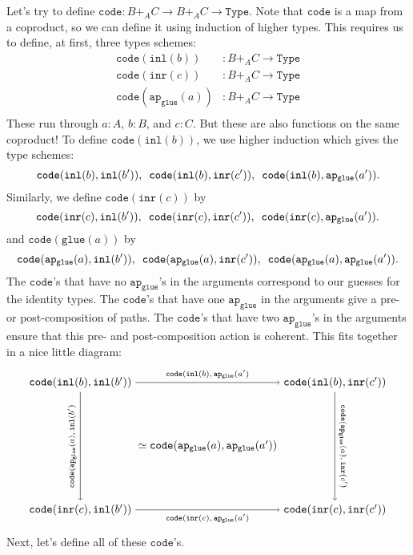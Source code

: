 \documentclass[11pt]{amsart}
\newcommand{\from}{\colon}
\newcommand{\tin}{\colon}
\newcommand{\type}[1]{\mathtt{#1}}
\begin{document}
Let's try to define 
$\type{code} \from B +_A C \to B +_A C \to \type{Type}$.  
Note that $\type{code}$ is a map from a coproduct, 
so we can define it using induction of higher types.
This requires us to define, at first, three types schemes:
\begin{align*}
	\type{code}(\type{inl}(b)) & \from B +_A C \to \type{Type} \\
	\type{code}(\type{inr}(c)) & \from B +_A C \to \type{Type} \\
	\type{code}(\type{ap_{glue}}(a)) & \from B +_A C \to \type{Type} \\
\end{align*}
These run through $a \tin A$, $b \tin B$, and $c \tin C$.  
But these are also functions on the same coproduct!
To define $\type{code}(\type{inl}(b))$, 
we use higher induction which gives the type schemes:
\[
	\type{code}(\type{inl}(b),\type{inl}(b')), \hspace{0.5em}
	\type{code}(\type{inl}(b),\type{inr}(c')), \hspace{0.5em}
	\type{code}(\type{inl}(b),\type{ap_{glue}}(a')).
\]
Similarly, we define $\type{code}(\type{inr}(c))$ by
\[
	\type{code}(\type{inr}(c),\type{inl}(b')), \hspace{0.5em}
	\type{code}(\type{inr}(c),\type{inr}(c')) , \hspace{0.5em}
	\type{code}(\type{inr}(c),\type{ap_{glue}}(a')).
\]
and $\type{code}(\type{glue}(a))$ by 
\[
	\type{code}(\type{ap_{glue}}(a),\type{inl}(b')), \hspace{0.5em}
	\type{code}(\type{ap_{glue}}(a),\type{inr}(c')) , \hspace{0.5em} 
	\type{code}(\type{ap_{glue}}(a),\type{ap_{glue}}(a')).
\]
The $\type{code}$'s that have 
no $\type{ap_{glue}}$'s in the arguments 
correspond to our guesses
for the identity types.
The $\type{code}$'s that have 
one $\type{ap_{glue}}$ in the arguments
give a pre- or post-composition
of paths.
The $\type{code}$'s that have 
two $\type{ap_{glue}}$'s in the arguments  
ensure that this pre- and post-composition
action is coherent.
This fits together in a nice little 
diagram:
\[
	\begin{tikzpicture}
		\node (AA) at (0,0) 
			{ $ \simeq \type{ code } ( \type{ ap_{glue} } ( a ) , \type{ ap_{glue} } ( a' )  )$ }; 
		\node (BB) at (-4,2) 
			{ $ \type{ code } ( \type{ inl } ( b ) , \type{ inl } ( b' )  )$ }; 
		\node (BC) at (4,2) 
			{ $ \type{ code } ( \type{ inl } ( b ) , \type{ inr } ( c' )  )$ }; 
		\node (CB) at (-4,-2) 
			{ $ \type{ code } ( \type{ inr } ( c ) , \type{ inl } ( b' )  )$ }; 
		\node (CC) at (4,-2) 
			{ $ \type{ code } ( \type{ inr } ( c ) , \type{ inr } ( c' )  )$ }; 
		\draw [->] (BB) to 
			node 
				[above] 
				{\scriptsize $ \type{ code } ( \type{ inl } ( b ) , \type{ ap_{glue} } ( a' ) $ } 
			(BC);
		\draw [->] (BB) to 	
			node 
				[rotate=90,above] 
				{ \scriptsize $ \type{ code } ( \type{ ap_{glue} } ( a ) , \type{ inl } ( b' ) $ } 
			(CB);
		\draw [->] (BC) to 
			node 
				[rotate=-90, above] 
				{\scriptsize $\type{ code } ( \type{ ap_{glue} } ( a ) , \type{ inr } ( c' ) $} 
			(CC);
		\draw [->] (CB) to 	
			node 
				[below] 
				{ \scriptsize $ \type{ code } ( \type{ inr } ( c ) , \type{ ap_{glue} } ( a' ) $ } 
			(CC);
	\end{tikzpicture}
\]
Next, let's define all of these $\type{code}$'s.





\end{document}
